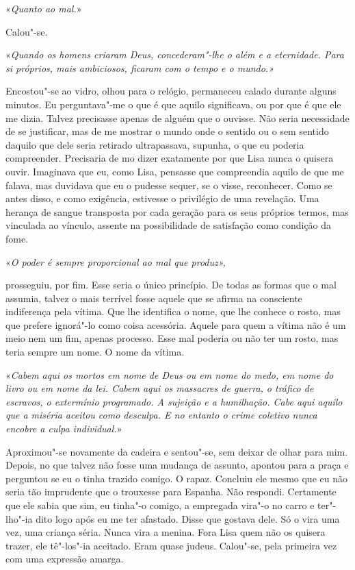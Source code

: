 «\emph{Quanto ao mal.}»

Calou"-se.

«\emph{Quando os homens criaram Deus, concederam"-lhe o além e a
eternidade. Para si próprios, mais ambiciosos, ficaram com o tempo e o
mundo.»}

Encostou"-se ao vidro, olhou para o relógio, permaneceu calado durante
alguns minutos. Eu perguntava"-me o que é que aquilo significava, ou
por que é que ele me dizia. Talvez precisasse apenas de alguém que o
ouvisse. Não seria necessidade de se justificar, mas de me mostrar o
mundo onde o sentido ou o sem sentido daquilo que dele seria retirado
ultrapassava, supunha, o que eu poderia compreender. Precisaria de mo
dizer exatamente por que Lisa nunca o quisera ouvir. Imaginava que eu,
como Lisa, pensasse que compreendia aquilo de que me falava, mas
duvidava que eu o pudesse sequer, se o visse, reconhecer. Como se antes
disso, e como exigência, estivesse o privilégio de uma revelação. Uma
herança de sangue transposta por cada geração para os seus próprios
termos, mas vinculada ao vínculo, assente na possibilidade de satisfação
como condição da fome.

«\emph{O poder é sempre proporcional ao mal que produz»,}

prosseguiu, por fim. Esse seria o único princípio. De todas as formas
que o mal assumia, talvez o mais terrível fosse aquele que se afirma na
consciente indiferença pela vítima. Que lhe identifica o nome, que lhe
conhece o rosto, mas que prefere ignorá"-lo como coisa acessória. Aquele
para quem a vítima não é um meio nem um fim, apenas processo. Esse mal
poderia ou não ter um rosto, mas teria sempre um nome. O nome da vítima.

«\emph{Cabem aqui os mortos em nome de Deus ou em nome do medo, em nome
do livro ou em nome da lei. Cabem aqui os massacres de guerra, o tráfico
de escravos, o extermínio programado. A sujeição e a humilhação. Cabe
aqui aquilo que a miséria aceitou como desculpa. E no entanto o crime
coletivo nunca encobre a culpa individual.}»

Aproximou"-se novamente da cadeira e sentou"-se, sem deixar de olhar
para mim. Depois, no que talvez não fosse uma mudança de assunto,
apontou para a praça e perguntou se eu o tinha trazido comigo. O rapaz.
Concluiu ele mesmo que eu não seria tão imprudente que o trouxesse para
Espanha. Não respondi. Certamente que ele sabia que sim, eu tinha"-o
comigo, a empregada vira"-o no carro e ter"-lho"-ia dito logo após eu me
ter afastado. Disse que gostava dele. Só o vira uma vez, uma criança
séria. Nunca vira a menina. Fora Lisa quem não os quisera trazer, ele
tê"-los"-ia aceitado. Eram quase judeus. Calou"-se, pela primeira vez
com uma expressão amarga.


